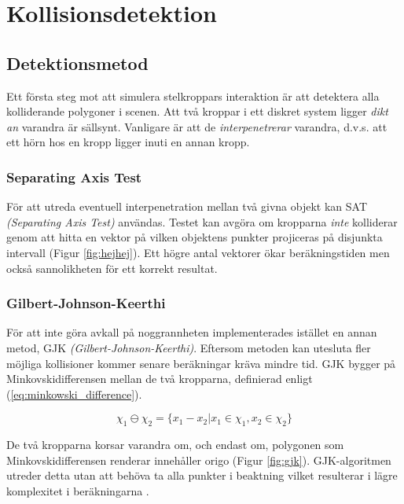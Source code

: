 \documentclass[a4paper,12pt,twopage,swedish]{article}
\begin{document}




\section{Kollisionsdetektion}

\subsection{Detektionsmetod}
Ett första steg mot att simulera stelkroppars interaktion är att detektera alla kolliderande polygoner i scenen. Att två kroppar i ett diskret system ligger \emph{dikt an} varandra är sällsynt. Vanligare är att de \emph{interpenetrerar} varandra, d.v.s. att ett hörn hos en kropp ligger inuti en annan kropp.

\subsubsection{Separating Axis Test}
För att utreda eventuell interpenetration mellan två givna objekt kan SAT\cite[s.~29]{vella08} \emph{(Separating Axis Test)} användas. Testet kan avgöra om kropparna \emph{inte} kolliderar genom att hitta en vektor på vilken objektens punkter projiceras på disjunkta intervall (Figur \ref{fig:hejhej}). Ett högre antal vektorer ökar beräkningstiden men också sannolikheten för ett korrekt resultat.

\subsubsection{Gilbert-Johnson-Keerthi}
\label{sec:gjk}
För att inte göra avkall på noggrannheten implementerades istället en annan metod, GJK \cite[s.~30]{vella08} \emph{(Gilbert-Johnson-Keerthi)}. Eftersom metoden kan utesluta fler möjliga kollisioner kommer senare beräkningar kräva mindre tid. GJK bygger på Minkovskidifferensen mellan de två kropparna, definierad enligt (\ref{eq:minkowski_difference}).

\begin{equation}\label{eq:minkowski_difference}
\chi_1 \ominus \chi_2 = \{ x_1 - x_2|x_1 \in \chi_1, x_2 \in \chi_2 \}
\end{equation}

De två kropparna korsar varandra om, och endast om, polygonen som Minkovskidifferensen renderar innehåller origo (Figur \ref{fig:gjk}). GJK-algoritmen utreder detta utan att behöva ta alla punkter i beaktning vilket resulterar i lägre komplexitet i beräkningarna \cite{bergen99}.
\end{document}
